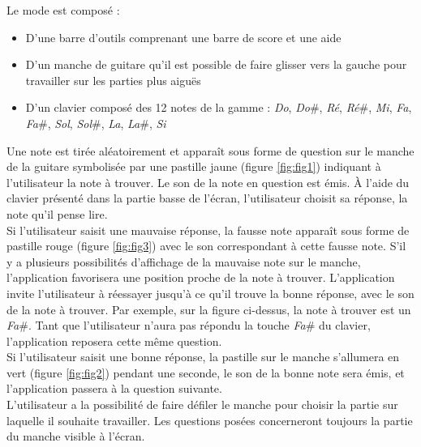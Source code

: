 \documentclass{scrreprt}
\begin{document}
\noindent Le mode est composé :
\begin{itemize}
	\item D'une barre d'outils comprenant une barre de score et une aide
	\item D'un manche de guitare qu'il est possible de faire glisser vers la gauche pour travailler sur les parties plus aiguës
	\item D'un clavier composé des 12 notes de la gamme : \textit{Do}, \textit{Do}\#, \textit{Ré}, \textit{Ré}\#, \textit{Mi}, \textit{Fa}, \textit{Fa}\#, \textit{Sol}, \textit{Sol}\#, \textit{La}, \textit{La}\#, \textit{Si}
\end{itemize}
\bigbreak
Une note est tirée aléatoirement et apparaît sous forme de question sur le manche de la guitare symbolisée par une pastille jaune (figure \ref{fig:fig1}) indiquant à l’utilisateur la note à trouver. Le son de la note en question est émis.
À l’aide du clavier présenté dans la partie basse de l’écran, l’utilisateur choisit sa réponse, la note qu’il pense lire.\\
\smallbreak
Si l'utilisateur saisit une mauvaise réponse, la fausse note apparaît sous forme de pastille rouge (figure \ref{fig:fig3}) avec le son correspondant à cette fausse note.
S'il y a plusieurs possibilités d'affichage de la mauvaise note sur le manche, l'application favorisera une position proche de la note à trouver.
L’application invite l'utilisateur à réessayer jusqu’à ce qu’il trouve la bonne réponse, avec le son de la note à trouver.
Par exemple, sur la figure ci-dessus, la note à trouver est un \textit{Fa}\#. 
Tant que l'utilisateur n'aura pas répondu la touche \textit{Fa}\# du clavier, l'application reposera cette même question.\\
Si l’utilisateur saisit une bonne réponse, la pastille sur le manche s’allumera en vert (figure \ref{fig:fig2}) pendant une seconde, le son de la bonne note sera émis, et l’application passera à la question suivante.\\
L'utilisateur a la possibilité de faire défiler le manche pour choisir la partie sur laquelle il souhaite travailler. 
Les questions posées concerneront toujours la partie du manche visible à l'écran.
\end{document}
